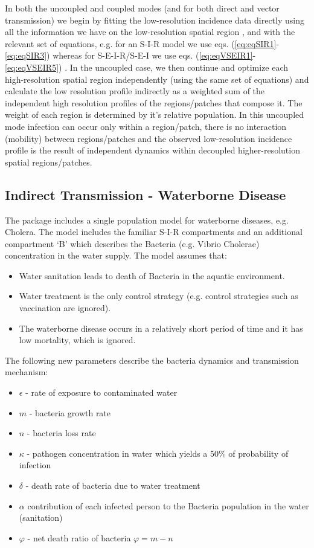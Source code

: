 \documentclass[a4paper]{article}
\begin{document}
In both the uncoupled and coupled modes (and for both direct and vector transmission) we begin by fitting the low-resolution incidence data directly using all the information we have on the low-resolution spatial region , and with the relevant set of equations, e.g. for an S-I-R model we use eqs. (\ref{eq:eqSIR1}-\ref{eq:eqSIR3}) whereas for S-E-I-R/S-E-I we use eqs. (\ref{eq:eqVSEIR1}-\ref{eq:eqVSEIR5})  . In the uncoupled case, we then continue and optimize each high-resolution spatial region independently (using the same set of equations) and calculate the low resolution profile indirectly as a weighted sum of the independent high resolution profiles of the regions/patches that compose it. The weight of each region is determined by it's relative population.  In this uncoupled mode infection can occur only within a region/patch, there is no interaction (mobility) between regions/patches and the observed low-resolution incidence profile is the result of independent dynamics within decoupled higher-resolution spatial regions/patches.

\subsection{Indirect Transmission - Waterborne Disease}
\label{sec:waterBorne}
The  package includes a single population model for waterborne diseases, e.g. Cholera. The model includes the familiar S-I-R compartments and an additional compartment `B' which describes the Bacteria (e.g. Vibrio Cholerae) concentration in the water supply.  The model assumes that:
\begin{itemize}
\item Water sanitation leads to death of Bacteria in the aquatic environment.
\item Water treatment is the only control strategy (e.g. control strategies such as vaccination are ignored).
\item The waterborne disease occurs in a relatively short period of time and it has low mortality, which is ignored.
\end{itemize}
The following new parameters describe the bacteria dynamics and transmission mechanism:
\begin{itemize}
\item $\epsilon$ - rate of exposure to contaminated water
\item $m$ - bacteria growth rate
\item $n$ - bacteria loss rate
\item $\kappa$ - pathogen concentration in water which yields a 50\% of probability of infection
\item $\delta$ - death rate of bacteria due to water treatment
\item $\alpha$ contribution of each infected person to the Bacteria population in the water (sanitation)
\item $\varphi$ - net death ratio of bacteria $\varphi = m - n$
\end{itemize}
\end{document}
